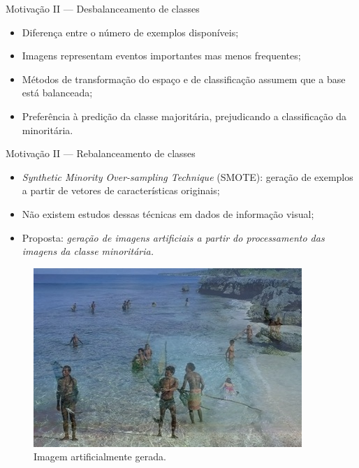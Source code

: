\documentclass[10pt]{beamer}
\begin{document}
\begin{frame}{Motivação II --- Desbalanceamento de classes}
  \setlength\leftmargini{1em}
  \begin{itemize}
    \item Diferença entre o número de exemplos disponíveis;
    \item Imagens representam eventos importantes mas menos frequentes;
    \item Métodos de transformação do espaço e de
    classificação assumem que a base está balanceada;
    \item Preferência à predição da classe majoritária, prejudicando a classificação da minoritária.
  \end{itemize}
\end{frame}
\begin{frame}{Motivação II --- Rebalanceamento de classes}
  \setlength\leftmargini{1em}
    \begin{itemize}
      \item \textit{Synthetic Minority Over-sampling Technique} (SMOTE): geração de exemplos a partir de vetores de características originais;
      \item Não existem estudos dessas técnicas em dados de informação visual;
      \item Proposta: \textit{geração de imagens artificiais a partir do processamento das imagens da classe minoritária.}
    \end{itemize}
    \begin{figure}[htbp]
      \begin{center}
        \includegraphics[width=.3\linewidth]{figuras/imagemgerada.jpg}
      \end{center}
      \caption{Imagem artificialmente gerada.}
    \end{figure}
\end{frame}
\end{document}
